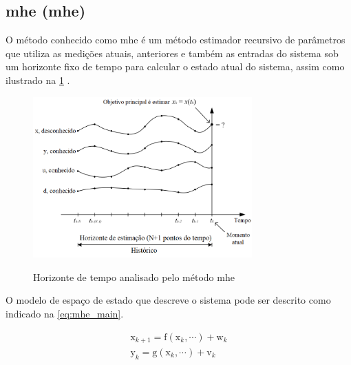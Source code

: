 \subsection{\acrlong{mhe} (\acrshort{mhe})}
\label{subsec:moving_horizon_estimation}

O método conhecido como \acrlong{mhe} é um método estimador recursivo de parâmetros
que utiliza as medições atuais, anteriores e também as entradas do sistema sob um horizonte
fixo de tempo para calcular o estado atual do sistema, assim como ilustrado na \cref{fig:mhe} \cite{Haugen2018}.

\begin{figure}[h]
	\caption{Horizonte de tempo analisado pelo método \acrlong{mhe}}
	\begin{center}
		\includegraphics[width=0.75\textwidth]{./5_images/fig_mhe.png} 
		\label{fig:mhe}
	\end{center}
	\centering
\end{figure}

O modelo de espaço de estado que descreve o sistema pode ser descrito como indicado na
\cref{eq:mhe_main}.

\begin{subequations}
	\label{eq:mhe_main}
	\begin{gather}
		\mathrm{x}_{k+1} = \mathrm{f}(\mathrm{x}_k, \cdots) + \mathrm{w}_k		\label{eq:mhe_main_a} \\
		\mathrm{y}_k = \mathrm{g}(\mathrm{x}_k, \cdots) + \mathrm{v}_k			\label{eq:mhe_main_b}
	\end{gather}
\end{subequations}

